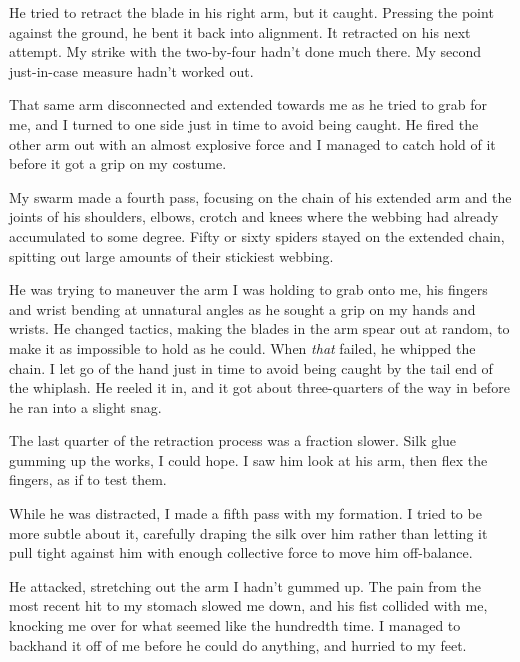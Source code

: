 He tried to retract the blade in his right arm, but it caught.  Pressing the point against the ground, he bent it back into alignment.  It retracted on his next attempt.  My strike with the two-by-four hadn't done much there.  My second just-in-case measure hadn't worked out.



That same arm disconnected and extended towards me as he tried to grab for me, and I turned to one side just in time to avoid being caught.  He fired the other arm out with an almost explosive force and I managed to catch hold of it before it got a grip on my costume.



My swarm made a fourth pass, focusing on the chain of his extended arm and the joints of his shoulders, elbows, crotch and knees where the webbing had already accumulated to some degree.  Fifty or sixty spiders stayed on the extended chain, spitting out large amounts of their stickiest webbing.



He was trying to maneuver the arm I was holding to grab onto me, his fingers and wrist bending at unnatural angles as he sought a grip on my hands and wrists.  He changed tactics, making the blades in the arm spear out at random, to make it as impossible to hold as he could.  When \emph{that} failed, he whipped the chain.  I let go of the hand just in time to avoid being caught by the tail end of the whiplash.  He reeled it in, and it got about three-quarters of the way in before he ran into a slight snag.



The last quarter of the retraction process was a fraction slower.  Silk glue gumming up the works, I could hope.  I saw him look at his arm, then flex the fingers, as if to test them.



While he was distracted, I made a fifth pass with my formation.  I tried to be more subtle about it, carefully draping the silk over him rather than letting it pull tight against him with enough collective force to move him off-balance.



He attacked, stretching out the arm I hadn't gummed up.  The pain from the most recent hit to my stomach slowed me down, and his fist collided with me, knocking me over for what seemed like the hundredth time.  I managed to backhand it off of me before he could do anything, and hurried to my feet.



